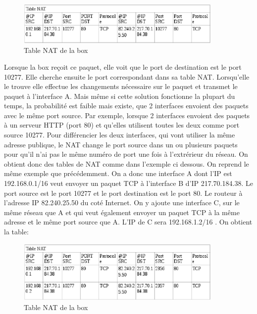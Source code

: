 \begin{figure}[h]
\centering
\includegraphics[width=10cm]{./pics/TableNAT1.eps}
\caption{Table NAT de la box}
\label{fig:NAT1}
\end{figure}

Lorsque la box reçoit ce paquet, elle voit que le port de destination est le
port 10277. Elle cherche ensuite le port correspondant dans sa table NAT.
Lorsqu'elle le trouve elle effectue les changements nécessaire sur le paquet et
transmet le paquet à l'interface A.
\newline
Mais même si cette solution fonctionne la plupart du temps, la probabilité est
faible mais existe, que 2 interfaces envoient des paquets avec le même port
source. Par exemple, lorsque 2 interfaces envoient des paquets à un serveur
HTTP (port 80) et qu'elles utilisent toutes les deux comme port source 10277.
Pour différencier les deux interfaces, qui vont utiliser la même adresse
publique, le NAT change le port source dans un ou plusieurs paquets pour qu'il
n'ai pas le même numéro de port une fois à l'extrérieur du réseau.  On obtient
donc des tables de NAT comme dans l'exemple ci dessous.
\newline
On reprend le même exemple que précédemment. On a donc une interface A dont l'IP
est 192.168.0.1/16 veut envoyer un paquet TCP à l'interface B d'IP 217.70.184.38.
Le port source est le port 10277 et le port destination est le port 80. Le
routeur à l'adresse IP  82.240.25.50 du coté Internet.
On y ajoute une interface C, sur le même réseau que A et qui veut également
envoyer un paquet TCP à la même adresse et le même port source que A. L'IP de C
sera 192.168.1.2/16 .
On obtient la table:

\begin{figure}[h]
\centering
\includegraphics[width=10cm]{./pics/TableNAT2.eps}
\caption{Table NAT de la box}
\label{fig:NAT2}
\end{figure}

